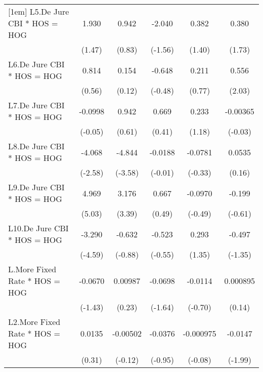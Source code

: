 {\begin{tabular}{l*{5}{c}}
[1em]
L5.De Jure CBI * HOS = HOG&    1.930         &    0.942         &   -2.040         &    0.382         &    0.380         \\
                &   (1.47)         &   (0.83)         &  (-1.56)         &   (1.40)         &   (1.73)         \\
[1em]
L6.De Jure CBI * HOS = HOG&    0.814         &    0.154         &   -0.648         &    0.211         &    0.556\sym{*}  \\
                &   (0.56)         &   (0.12)         &  (-0.48)         &   (0.77)         &   (2.03)         \\
[1em]
L7.De Jure CBI * HOS = HOG&  -0.0998         &    0.942         &    0.669         &    0.233         & -0.00365         \\
                &  (-0.05)         &   (0.61)         &   (0.41)         &   (1.18)         &  (-0.03)         \\
[1em]
L8.De Jure CBI * HOS = HOG&   -4.068\sym{*}  &   -4.844\sym{***}&  -0.0188         &  -0.0781         &   0.0535         \\
                &  (-2.58)         &  (-3.58)         &  (-0.01)         &  (-0.33)         &   (0.16)         \\
[1em]
L9.De Jure CBI * HOS = HOG&    4.969\sym{***}&    3.176\sym{***}&    0.667         &  -0.0970         &   -0.199         \\
                &   (5.03)         &   (3.39)         &   (0.49)         &  (-0.49)         &  (-0.61)         \\
[1em]
L10.De Jure CBI * HOS = HOG&   -3.290\sym{***}&   -0.632         &   -0.523         &    0.293         &   -0.497         \\
                &  (-4.59)         &  (-0.88)         &  (-0.55)         &   (1.35)         &  (-1.35)         \\
[1em]
L.More Fixed Rate * HOS = HOG&  -0.0670         &  0.00987         &  -0.0698         &  -0.0114         & 0.000895         \\
                &  (-1.43)         &   (0.23)         &  (-1.64)         &  (-0.70)         &   (0.14)         \\
[1em]
L2.More Fixed Rate * HOS = HOG&   0.0135         & -0.00502         &  -0.0376         &-0.000975         &  -0.0147\sym{*}  \\
                &   (0.31)         &  (-0.12)         &  (-0.95)         &  (-0.08)         &  (-1.99)         \\

\end{tabular}}
